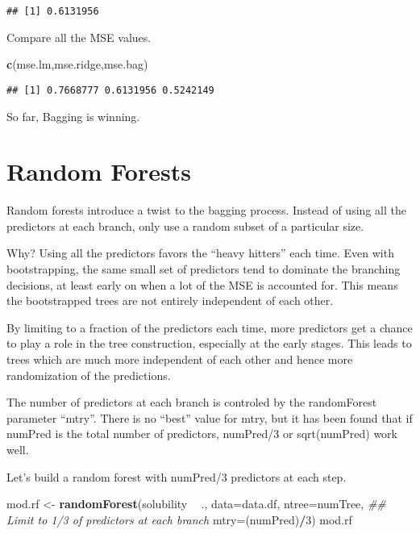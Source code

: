 \documentclass[]{article}
\newenvironment{Shaded}{\begin{snugshade}}{\end{snugshade}}
\newcommand{\CommentTok}[1]{\textcolor[rgb]{0.56,0.35,0.01}{\textit{#1}}}
\newcommand{\DataTypeTok}[1]{\textcolor[rgb]{0.13,0.29,0.53}{#1}}
\newcommand{\DecValTok}[1]{\textcolor[rgb]{0.00,0.00,0.81}{#1}}
\newcommand{\KeywordTok}[1]{\textcolor[rgb]{0.13,0.29,0.53}{\textbf{#1}}}
\newcommand{\NormalTok}[1]{#1}
\newcommand{\OperatorTok}[1]{\textcolor[rgb]{0.81,0.36,0.00}{\textbf{#1}}}
\newcommand{\StringTok}[1]{\textcolor[rgb]{0.31,0.60,0.02}{#1}}
\begin{document}
\begin{verbatim}
## [1] 0.6131956
\end{verbatim}

Compare all the MSE values.

\begin{Shaded}
\begin{Highlighting}[]
\KeywordTok{c}\NormalTok{(mse.lm,mse.ridge,mse.bag)}
\end{Highlighting}
\end{Shaded}

\begin{verbatim}
## [1] 0.7668777 0.6131956 0.5242149
\end{verbatim}

So far, Bagging is winning.

\hypertarget{random-forests}{%
\section{Random Forests}\label{random-forests}}

Random forests introduce a twist to the bagging process. Instead of
using all the predictors at each branch, only use a random subset of a
particular size.

Why? Using all the predictors favors the ``heavy hitters'' each time.
Even with bootstrapping, the same small set of predictors tend to
dominate the branching decisions, at least early on when a lot of the
MSE is accounted for. This means the bootstrapped trees are not entirely
independent of each other.

By limiting to a fraction of the predictors each time, more predictors
get a chance to play a role in the tree construction, especially at the
early stages. This leads to trees which are much more independent of
each other and hence more randomization of the predictions.

The number of predictors at each branch is controled by the randomForest
parameter ``mtry''. There is no ``best'' value for mtry, but it has been
found that if numPred is the total number of predictors, numPred/3 or
sqrt(numPred) work well.

Let's build a random forest with numPred/3 predictors at each step.

\begin{Shaded}
\begin{Highlighting}[]
\NormalTok{mod.rf <-}\StringTok{ }\KeywordTok{randomForest}\NormalTok{(solubility }\OperatorTok{~}\StringTok{ }\NormalTok{.,}
                       \DataTypeTok{data=}\NormalTok{data.df,}
                       \DataTypeTok{ntree=}\NormalTok{numTree,}
                       \CommentTok{## Limit to 1/3 of predictors at each branch}
                       \DataTypeTok{mtry=}\NormalTok{(numPred)}\OperatorTok{/}\DecValTok{3}\NormalTok{)}
\NormalTok{mod.rf}
\end{Highlighting}
\end{Shaded}
\end{document}
